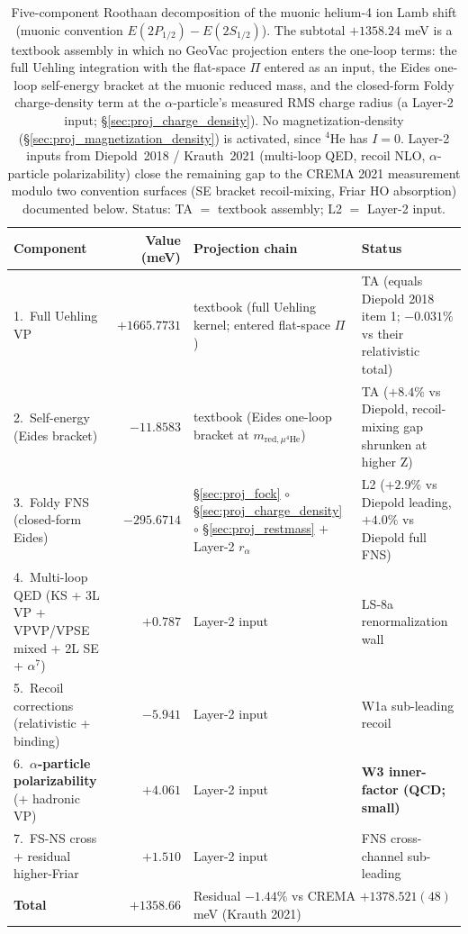 \documentclass[11pt]{article}
\begin{document}
\begin{table}[h!]
\centering\small
\caption{Five-component Roothaan decomposition of the muonic helium-4
ion Lamb shift (muonic convention $E(2P_{1/2})-E(2S_{1/2})$).  The
subtotal $+1358.24$ meV is a textbook assembly in which no GeoVac
projection enters the one-loop terms: the full Uehling integration with
the flat-space $\Pi$ entered as an input, the Eides one-loop
self-energy bracket at the muonic reduced mass, and the
closed-form Foldy charge-density term at the $\alpha$-particle's measured
RMS charge radius (a Layer-2 input; \S\ref{sec:proj_charge_density}).  No
magnetization-density (\S\ref{sec:proj_magnetization_density}) is
activated, since $^4$He has $I=0$.  Layer-2 inputs from
Diepold~2018 / Krauth~2021 (multi-loop QED, recoil NLO,
$\alpha$-particle polarizability) close the remaining gap to the
CREMA 2021 measurement modulo two convention surfaces (SE bracket
recoil-mixing, Friar HO absorption) documented below.  Status: TA $=$
textbook assembly; L2 $=$ Layer-2 input.}
\label{tab:autopsy_muhe4_lamb}
\begin{tabular}{p{4.7cm} r p{4.8cm} l}
\toprule
Component & Value (meV) & Projection chain & Status \\
\midrule
1.~Full Uehling VP & $+1665.7731$ &
textbook (full Uehling kernel; entered flat-space $\Pi$)
& TA (equals Diepold 2018 item 1; $-0.031\%$ vs their relativistic total) \\
2.~Self-energy (Eides bracket) & $-11.8583$ &
textbook (Eides one-loop bracket at $m_{\text{red},\mu^4\text{He}}$)
& TA ($+8.4\%$ vs Diepold, recoil-mixing gap shrunken at higher Z) \\
3.~Foldy FNS (closed-form Eides) & $-295.6714$ &
\S\ref{sec:proj_fock} $\circ$ \S\ref{sec:proj_charge_density}
$\circ$ \S\ref{sec:proj_restmass} $+$ Layer-2 $r_\alpha$
& L2 ($+2.9\%$ vs Diepold leading, $+4.0\%$ vs Diepold full FNS) \\
4.~Multi-loop QED (KS + 3L VP + VPVP/VPSE mixed + 2L SE + $\alpha^7$) & $+0.787$ &
Layer-2 input & LS-8a renormalization wall \\
5.~Recoil corrections (relativistic + binding) & $-5.941$ &
Layer-2 input & W1a sub-leading recoil \\
6.~\textbf{$\alpha$-particle polarizability} (+ hadronic VP) & $\mathbf{+4.061}$ &
Layer-2 input & \textbf{W3 inner-factor (QCD; small)} \\
7.~FS-NS cross + residual higher-Friar & $+1.510$ &
Layer-2 input & FNS cross-channel sub-leading \\
\midrule
\textbf{Total} & $+1358.66$ & \multicolumn{2}{l}{Residual
$-1.44\%$ vs CREMA $+1378.521(48)$ meV (Krauth 2021)} \\
\bottomrule
\end{tabular}
\end{table}
\end{document}

